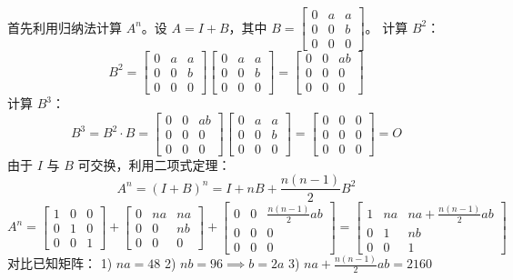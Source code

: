 \begin{questions}
\begin{solution}
首先利用归纳法计算 $A^n$。设 $A = I + B$，其中 $B = \begin{bmatrix} 0 & a & a \\ 0 & 0 & b \\ 0 & 0 & 0 \end{bmatrix}$。
计算 $B^2$：
\[ B^2 = \begin{bmatrix} 0 & a & a \\ 0 & 0 & b \\ 0 & 0 & 0 \end{bmatrix} \begin{bmatrix} 0 & a & a \\ 0 & 0 & b \\ 0 & 0 & 0 \end{bmatrix} = \begin{bmatrix} 0 & 0 & ab \\ 0 & 0 & 0 \\ 0 & 0 & 0 \end{bmatrix} \]
计算 $B^3$：
\[ B^3 = B^2 \cdot B = \begin{bmatrix} 0 & 0 & ab \\ 0 & 0 & 0 \\ 0 & 0 & 0 \end{bmatrix} \begin{bmatrix} 0 & a & a \\ 0 & 0 & b \\ 0 & 0 & 0 \end{bmatrix} = \begin{bmatrix} 0 & 0 & 0 \\ 0 & 0 & 0 \\ 0 & 0 & 0 \end{bmatrix} = O \]
由于 $I$ 与 $B$ 可交换，利用二项式定理：
\[ A^n = (I + B)^n = I + nB + \frac{n(n-1)}{2}B^2 \]
\[ A^n = \begin{bmatrix} 1 & 0 & 0 \\ 0 & 1 & 0 \\ 0 & 0 & 1 \end{bmatrix} + \begin{bmatrix} 0 & na & na \\ 0 & 0 & nb \\ 0 & 0 & 0 \end{bmatrix} + \begin{bmatrix} 0 & 0 & \frac{n(n-1)}{2}ab \\ 0 & 0 & 0 \\ 0 & 0 & 0 \end{bmatrix} = \begin{bmatrix} 1 & na & na + \frac{n(n-1)}{2}ab \\ 0 & 1 & nb \\ 0 & 0 & 1 \end{bmatrix} \]
对比已知矩阵：
1) $na = 48$
2) $nb = 96 \implies b = 2a$
3) $na + \frac{n(n-1)}{2}ab = 2160$


\end{solution}
\end{questions}

